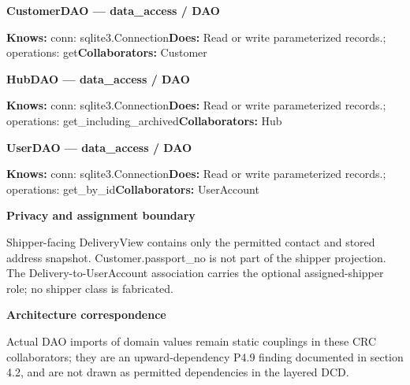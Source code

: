 \textbf{CustomerDAO --- data\_access / \guillemotleft{}DAO\guillemotright{}}

\textbf{Knows:} conn: sqlite3.Connection\newline{}\textbf{Does:} Read or write parameterized records.; operations: get\newline{}\textbf{Collaborators:} Customer

\textbf{HubDAO --- data\_access / \guillemotleft{}DAO\guillemotright{}}

\textbf{Knows:} conn: sqlite3.Connection\newline{}\textbf{Does:} Read or write parameterized records.; operations: get\_including\_archived\newline{}\textbf{Collaborators:} Hub

\textbf{UserDAO --- data\_access / \guillemotleft{}DAO\guillemotright{}}

\textbf{Knows:} conn: sqlite3.Connection\newline{}\textbf{Does:} Read or write parameterized records.; operations: get\_by\_id\newline{}\textbf{Collaborators:} UserAccount

\textbf{Privacy and assignment boundary}

Shipper-facing DeliveryView contains only the permitted contact and stored address snapshot. Customer.passport\_no is not part of the shipper projection. The Delivery-to-UserAccount association carries the optional assigned-shipper role; no shipper class is fabricated.

\textbf{Architecture correspondence}

Actual DAO imports of domain values remain static couplings in these CRC collaborators; they are an upward-dependency P4.9 finding documented in section 4.2, and are not drawn as permitted dependencies in the layered DCD.
